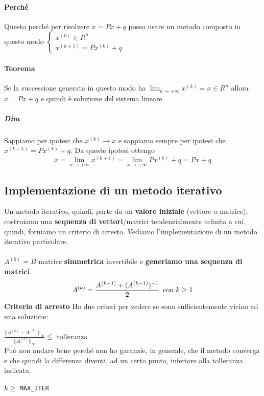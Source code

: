 \documentclass[10pt]{book}
\begin{document}
\paragraph{Perché} Questo perché per risolvere $x = Px + q$ posso usare un metodo composto in questo modo $\left\{ \begin{array}{l}
x^{(0)} \in R^n\\
x^{(k + 1)} = Px^{(k)} + q
\end{array} \right.$
\paragraph{Teorema} Se la successione generata in questo modo ha $\lim_{k\to +\infty} x^{(k)} = x \in R^n$ allora $x = Px + q$ e quindi è soluzione del sistema lineare
\subparagraph{Dim} Sappiamo per ipotesi che $x^{(k)} \rightarrow x$ e sappiamo sempre per ipotesi che $x^{(k + 1)} = Px^{(k)} + q$. Da queste ipotesi ottengo
$$x = \lim_{x\to +\infty}x^{(k + 1)} = \lim_{x\to +\infty} Px^{(k)} + q = Px + q$$
\subsection{Implementazione di un metodo iterativo}
Un metodo iterativo, quindi, parte da un \textbf{valore iniziale} (vettore o matrice), costruiamo una \textbf{sequenza di vettori}/matrici tendenzialmente infinita a cui, quindi, forniamo un criterio di arresto. Vediamo l'implementazione di un metodo iterativo particolare.\\\\
$A^{(0)} = B$ matrice \textbf{simmetrica} invertibile e \textbf{generiamo una sequenza di matrici}.\\
$$A^{(k)} = \frac{A^{(k-1)} + (A^{(k-1)})^{-1}}{2}\:\:\textsl{con }k \geq 1$$
\textbf{Criterio di arresto} Ho due criteri per vedere se sono sufficientemente vicino ad una soluzione:
\begin{list}{}{}
	\item $\frac{||A^{(k)} - A^{(k)}||_{\infty}}{||A^{(k)}||_{\infty}} \leq$ tolleranza\\
	Può non andare bene perché non ho garanzie, in generale, che il metodo converga e che quindi la differenza diventi, ad un certo punto, inferiore alla tolleranza indicata.
	\item $k \geq$ \texttt{MAX\_ITER}
\end{list}
\pagebreak
\end{document}
